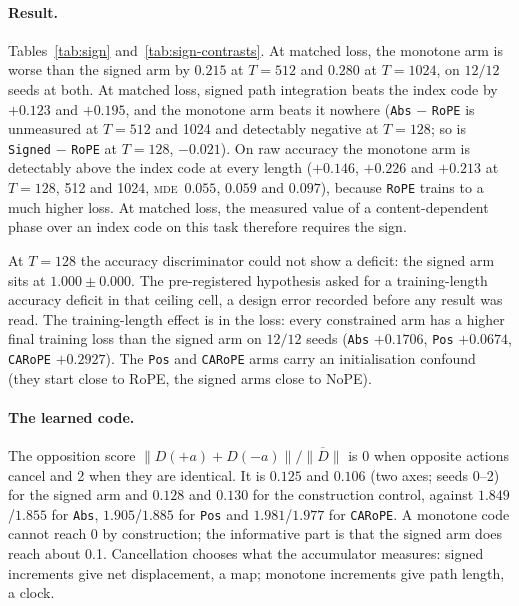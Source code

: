 \documentclass[10pt]{article}
\newcommand{\mde}{\textsc{mde}}
\newcommand{\arm}[1]{\texttt{#1}}
\begin{document}
\paragraph{Result.} Tables~\ref{tab:sign} and~\ref{tab:sign-contrasts}. At matched loss, the monotone
arm is worse than the signed arm by $0.215$ at $T=512$ and $0.280$ at $T=1024$, on $12/12$ seeds at
both. At matched loss, signed path integration beats the index code by $+0.123$ and $+0.195$, and the
monotone arm beats it nowhere (\arm{Abs} $-$ \arm{RoPE} is unmeasured at $T=512$ and 1024 and detectably
negative at $T=128$; so is \arm{Signed} $-$ \arm{RoPE} at $T=128$, $-0.021$). On raw accuracy the monotone
arm is detectably above the index code at every length ($+0.146$, $+0.226$ and $+0.213$ at $T=128$, 512 and
1024, \mde\ $0.055$, $0.059$ and $0.097$), because \arm{RoPE} trains to a much higher loss. At matched loss,
the measured value of a content-dependent phase over an index code on this task therefore requires the
sign. %

At $T=128$ the accuracy discriminator could not show a deficit: the signed arm sits at
$1.000\pm0.000$. The pre-registered hypothesis asked for a training-length accuracy deficit in that
ceiling cell, a design error recorded before any result was read. The training-length effect is in the
loss: every constrained arm has a higher final training loss than the signed arm on $12/12$ seeds
(\arm{Abs} $+0.1706$, \arm{Pos} $+0.0674$, \arm{CARoPE} $+0.2927$). The \arm{Pos} and \arm{CARoPE}
arms carry an initialisation confound (they start close to RoPE, the signed arms close to NoPE).

\paragraph{The learned code.} The opposition score $\|D(+a)+D(-a)\|/\overline{\|D\|}$ is 0 when opposite
actions cancel and 2 when they are identical. It is $0.125$ and $0.106$ (two axes; seeds 0--2) for the signed arm
and $0.128$ and $0.130$ for the construction control, against $1.849$/$1.855$ for \arm{Abs},
$1.905$/$1.885$ for \arm{Pos} and $1.981$/$1.977$ for \arm{CARoPE}. A monotone code cannot reach 0 by
construction; the informative part is that the signed arm does reach about 0.1. Cancellation chooses
what the accumulator measures: signed increments give net displacement, a map; monotone increments give
path length, a clock. %
\end{document}
